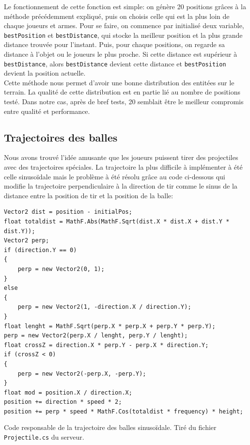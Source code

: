 \documentclass[a4paper]{article}
\begin{document}
Le fonctionnement de cette fonction est simple: on génère 20 positions grâces à la méthode précédemment expliqué, puis on choisis celle qui est la plus loin de chaque joueurs et armes. Pour se faire, on commence par initialisé deux variable, \texttt{bestPosition} et \texttt{bestDistance}, qui stocke la meilleur position et la plus grande distance trouvée pour l'instant. Puis, pour chaque positions, on regarde sa distance à l'objet ou le joueurs le plus proche. Si cette distance est supérieur à \texttt{bestDistance}, alors \texttt{bestDistance} devient cette distance et \texttt{bestPosition} devient la position actuelle. \\
Cette méthode nous permet d'avoir une bonne distribution des entitées sur le terrain. La qualité de cette distribution est en partie lié au nombre de positions testé. Dans notre cas, après de bref tests, 20 semblait être le meilleur compromis entre qualité et performance.

\subsection{Trajectoires des balles}
Nous avons trouvé l'idée amusante que les joueurs puissent tirer des projectiles avec des trajectoires spéciales. La trajectoire la plus difficile à implémenter à été celle sinusoïdale mais le problème à été résolu grâce au code ci-dessous qui modifie la trajectoire perpendiculaire à la direction de tir comme le sinus de la distance entre la position de tir et la position de la balle:


\begin{listing}[H]
\begin{verbatim}
Vector2 dist = position - initialPos;
float totaldist = MathF.Abs(MathF.Sqrt(dist.X * dist.X + dist.Y * dist.Y));
Vector2 perp;
if (direction.Y == 0)
{
    perp = new Vector2(0, 1);
}
else
{
    perp = new Vector2(1, -direction.X / direction.Y);
}
float lenght = MathF.Sqrt(perp.X * perp.X + perp.Y * perp.Y);
perp = new Vector2(perp.X / lenght, perp.Y / lenght);
float crossZ = direction.X * perp.Y - perp.X * direction.Y;
if (crossZ < 0)
{
    perp = new Vector2(-perp.X, -perp.Y);
}
float mod = position.X / direction.X;
position += direction * speed * 2;
position += perp * speed * MathF.Cos(totaldist * frequency) * height;
\end{verbatim}
\caption{Code responsable de la trajectoire des balles sinusoïdale. Tiré du fichier  \texttt{Projectile.cs} du serveur.}
\label{extrait:projectile}
\end{listing}
\end{document}
